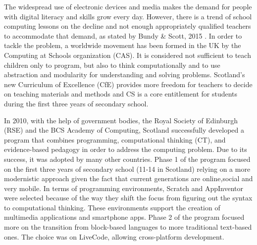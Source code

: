 The widespread use of electronic devices and media makes the demand for people with digital literacy and skills grow every day. However, there is a trend of school computing lessons on the decline and not enough appropriately qualified teachers to accommodate that demand, as stated by Bundy \& Scott, 2015 \cite{CompThinking}.
In order to tackle the problem, a worldwide movement has been formed in the UK by the Computing at Schools organization (CAS)\cite{CAS}.  It is considered not sufficient to teach children only to program, but also to think computationally and to use abstraction and modularity for understanding and solving problems. Scotland's new Curriculum of Excellence (CfE) provides more freedom for teachers to decide on teaching materials and methods and CS is a core entitlement for  students during the first three years of secondary school.

In 2010, with the help of government bodies, the Royal Society of Edinburgh
(RSE) and the BCS Academy of Computing, Scotland successfully developed a program that combines programming, computational thinking (CT), and evidence-based pedagogy in order to address the computing problem. Due to its success, it was adopted by many other countries. Phase 1 of the program focused on the first three years of secondary school (11-14 in Scotland) relying on a more modernistic approach given the fact that current generations are online,social and very mobile. In terms of programming environments, Scratch and AppInventor were selected because of the way they shift the focus from figuring out the syntax to computational thinking. These environments support the creation of multimedia applications and smartphone apps. Phase 2 of the program focused more on the transition from block-based languages to more traditional text-based ones. The choice was on LiveCode, allowing cross-platform development.




